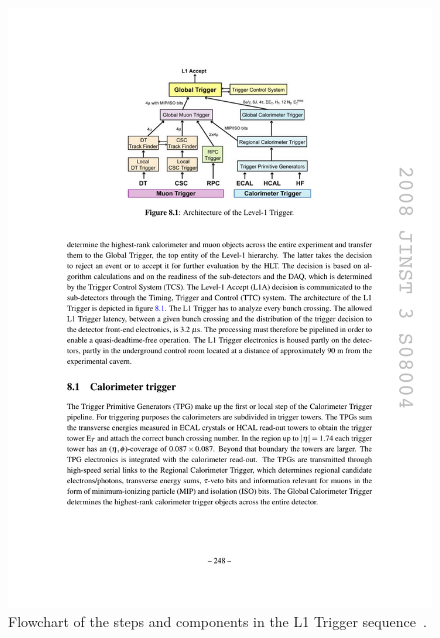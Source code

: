 \begin{figure}[hbtp]
  \begin{center}
    \includegraphics[width=1.5\cmsFigWidth]{figures/cms-L1flowchart}
    \caption{Flowchart of the steps and components in the L1 Trigger sequence~\cite{1748-0221-3-08-S08004}.}
    \label{fig:cms-L1flowchart}
  \end{center}
\end{figure}

